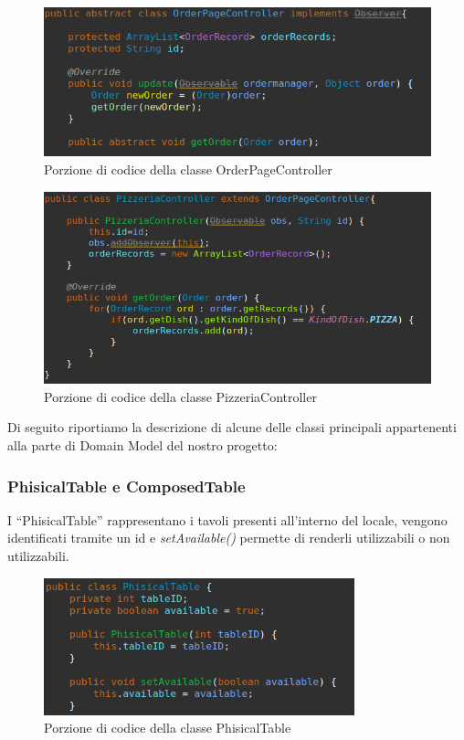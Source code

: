 \documentclass{article}
\begin{document}
\begin{figure}[!h]
\centering
\includegraphics[width= 12cm]{"Codice/OrderPage.PNG"}
\caption{Porzione di codice della classe OrderPageController}
\end{figure}

\begin{figure}[!h]
\centering
\includegraphics[width= 12cm]{"Codice/PizzeriaPage.PNG"}
\caption{Porzione di codice della classe PizzeriaController}
\end{figure}

\newpage

\noindent Di seguito riportiamo la descrizione di alcune delle classi principali appartenenti alla parte di Domain Model del nostro progetto: 

\subsubsection{PhisicalTable e ComposedTable}

I ``PhisicalTable'' rappresentano i tavoli presenti all'interno del locale, vengono identificati tramite un id e \textit{setAvailable()} permette di renderli utilizzabili o non utilizzabili.

\begin{figure}[!h]
\centering
\includegraphics[width= 9cm]{"Codice/PhisicalTable.PNG"}
\caption{Porzione di codice della classe PhisicalTable}
\end{figure}
\end{document}

